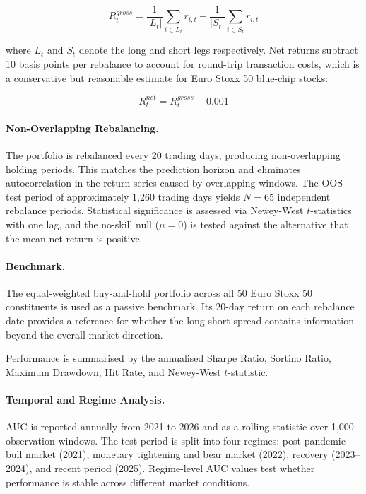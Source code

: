 \begin{equation}
R^{gross}_t = \frac{1}{|L_t|}\sum_{i \in L_t} r_{i,t} - \frac{1}{|S_t|}\sum_{i \in S_t} r_{i,t}
\label{eq:portret}
\end{equation}

where $L_t$ and $S_t$ denote the long and short legs respectively. Net returns subtract 10 basis points per rebalance to account for round-trip transaction costs, which is a conservative but reasonable estimate for Euro Stoxx 50 blue-chip stocks:

\begin{equation}
R^{net}_t = R^{gross}_t - 0.001
\label{eq:netret}
\end{equation}

\paragraph{Non-Overlapping Rebalancing.}
The portfolio is rebalanced every 20 trading days, producing non-overlapping holding periods. This matches the prediction horizon and eliminates autocorrelation in the return series caused by overlapping windows. The OOS test period of approximately 1,260 trading days yields $N = 65$ independent rebalance periods. Statistical significance is assessed via Newey-West $t$-statistics with one lag, and the no-skill null ($\mu = 0$) is tested against the alternative that the mean net return is positive.

\paragraph{Benchmark.}
The equal-weighted buy-and-hold portfolio across all 50 Euro Stoxx 50 constituents is used as a passive benchmark. Its 20-day return on each rebalance date provides a reference for whether the long-short spread contains information beyond the overall market direction.

Performance is summarised by the annualised Sharpe Ratio, Sortino Ratio, Maximum Drawdown, Hit Rate, and Newey-West $t$-statistic.

\paragraph{Temporal and Regime Analysis.}
AUC is reported annually from 2021 to 2026 and as a rolling statistic over 1,000-observation windows. The test period is split into four regimes: post-pandemic bull market (2021), monetary tightening and bear market (2022), recovery (2023--2024), and recent period (2025). Regime-level AUC values test whether performance is stable across different market conditions.

